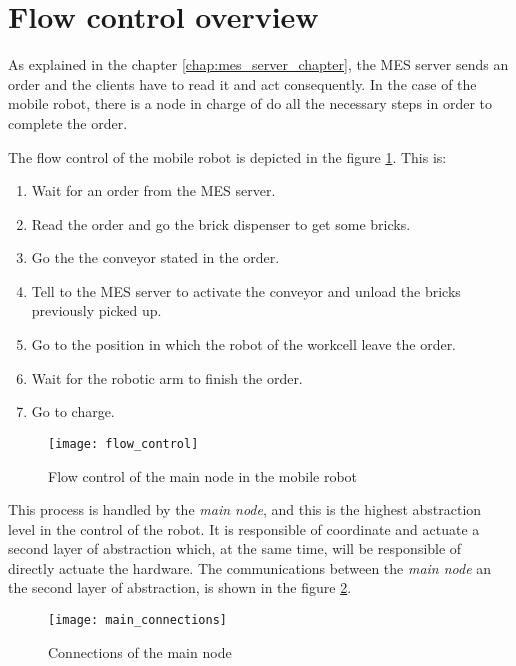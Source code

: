 \section{Flow control overview} %
\label{sec:mr_flow_control_overview}

As explained in the chapter \ref{chap:mes_server_chapter}, the MES server sends an order and the clients have to read it and act consequently.
In the case of the mobile robot, there is a node in charge of do all the necessary steps in order to complete the order.

The flow control of the mobile robot is depicted in the figure \ref{fig:flow_control}.
This is:
\begin{enumerate}
	\item Wait for an order from the MES server.
	\item Read the order and go the brick dispenser to get some bricks.
	\item Go the the conveyor stated in the order.
	\item Tell to the MES server to activate the conveyor and unload the bricks previously picked up.
	\item Go to the position in which the robot of the workcell leave the order.
	\item Wait for the robotic arm to finish the order.
	\item Go to charge.
\end{enumerate}

\begin{figure}[htb]
	\centering
	\texttt{[image: flow\_control]}
	\caption{Flow control of the main node in the mobile robot}
	\label{fig:flow_control}
\end{figure}

This process is handled by the \emph{main node}, and this is the highest abstraction level in the control of the robot.
It is responsible of coordinate and actuate a second layer of abstraction which, at the same time, will be responsible of directly actuate the hardware.
The communications between the \emph{main node} an the second layer of abstraction, is shown in the figure \ref{fig:main_connections}.

\begin{figure}[htb]
	\centering
	\texttt{[image: main\_connections]}
	\caption{Connections of the main node}
	\label{fig:main_connections}
\end{figure}

